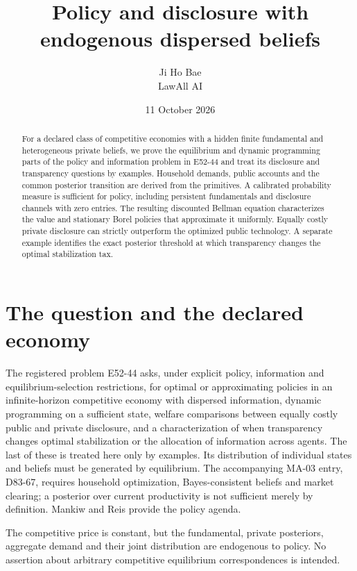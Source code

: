 \documentclass[11pt,a4paper]{article}
\title{Policy and disclosure with endogenous dispersed beliefs}
\author{Ji Ho Bae\\\small LawAll AI}
\date{11 October 2026}
\begin{document}
\maketitle
\begin{abstract}
For a declared class of competitive economies with a hidden finite fundamental
and heterogeneous private beliefs, we prove the equilibrium and dynamic
programming parts of the policy and information problem in E52-44 and treat its
disclosure and transparency questions by examples. Household demands, public
accounts and the common posterior transition
are derived from the primitives. A calibrated probability measure is sufficient
for policy, including persistent fundamentals and disclosure channels with zero
entries. The resulting discounted Bellman equation characterizes the value and
stationary Borel policies that approximate it uniformly. Equally costly private
disclosure can strictly outperform the optimized public technology. A separate
example identifies the exact posterior threshold at which transparency changes
the optimal stabilization tax.
\end{abstract}

\section{The question and the declared economy}
The registered problem E52-44 \cite{catalogue} asks, under explicit policy,
information and equilibrium-selection restrictions, for optimal or approximating
policies in an infinite-horizon competitive economy with dispersed information,
dynamic programming on a sufficient state, welfare comparisons between
equally costly public and private disclosure, and a characterization of when
transparency changes optimal stabilization or the allocation of information
across agents. The last of these is treated here only by examples. Its
distribution of individual
states and beliefs must be generated by equilibrium. The accompanying MA-03
entry, D83-67, requires household optimization, Bayes-consistent beliefs and
market clearing; a posterior over current productivity is not sufficient merely
by definition. Mankiw and Reis \cite[Sections 5.2 and 7.3]{mankiwreis} provide the
policy agenda.

The competitive
price is constant, but the fundamental, private posteriors, aggregate demand and
their joint distribution are endogenous to policy. No assertion about arbitrary
competitive equilibrium correspondences is intended.
\end{document}
